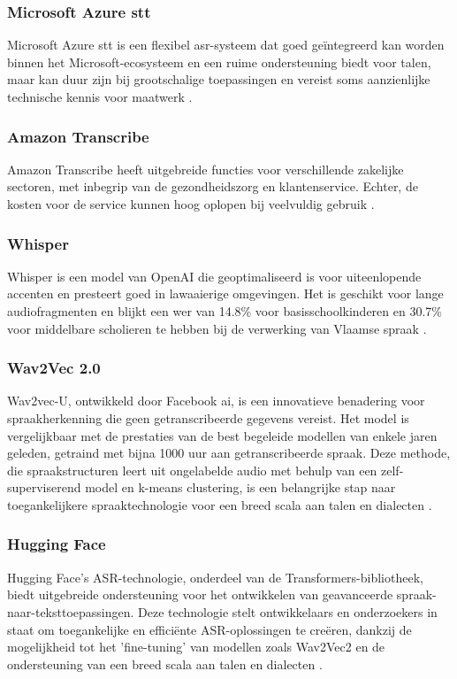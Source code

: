 \subsubsection{Microsoft Azure \gls{stt}}
Microsoft Azure \gls{stt} is een flexibel \gls{asr}-systeem dat goed geïntegreerd kan worden binnen het Microsoft-ecosysteem en een ruime ondersteuning biedt voor talen, maar kan duur zijn bij grootschalige toepassingen en vereist soms aanzienlijke technische kennis voor maatwerk \autocite{azurespeech2024}.

\subsubsection{Amazon Transcribe}
Amazon Transcribe heeft uitgebreide functies voor verschillende zakelijke sectoren, met inbegrip van de gezondheidszorg en klantenservice. Echter, de kosten voor de service kunnen hoog oplopen bij veelvuldig gebruik \textcite{AmazonTranscribe2023}.

\subsubsection{Whisper}
 Whisper is een model van OpenAI die geoptimaliseerd is voor uiteenlopende accenten en presteert goed in lawaaierige omgevingen. Het is geschikt voor lange audiofragmenten en blijkt een \gls{wer} van 14.8\% voor basisschoolkinderen en 30.7\% voor middelbare scholieren te hebben bij de verwerking van Vlaamse spraak \autocite{whisper2023}.

\subsubsection{Wav2Vec 2.0}
Wav2vec-U, ontwikkeld door Facebook \gls{ai}, is een innovatieve benadering voor spraakherkenning die geen getranscribeerde gegevens vereist. Het model is vergelijkbaar met de prestaties van de best begeleide modellen van enkele jaren geleden, getraind met bijna 1000 uur aan getranscribeerde spraak. Deze methode, die spraakstructuren leert uit ongelabelde audio met behulp van een zelf-superviserend model en k-means clustering, is een belangrijke stap naar toegankelijkere spraaktechnologie voor een breed scala aan talen en dialecten \autocite{wav2vecu2021}.

\subsubsection{Hugging Face}
Hugging Face's ASR-technologie, onderdeel van de Transformers-bibliotheek, biedt uitgebreide ondersteuning voor het ontwikkelen van geavanceerde spraak-naar-teksttoepassingen. Deze technologie stelt ontwikkelaars en onderzoekers in staat om toegankelijke en efficiënte ASR-oplossingen te creëren, dankzij de mogelijkheid tot het 'fine-tuning' van modellen zoals Wav2Vec2 en de ondersteuning van een breed scala aan talen en dialecten \autocite{huggingface2023asr}.

